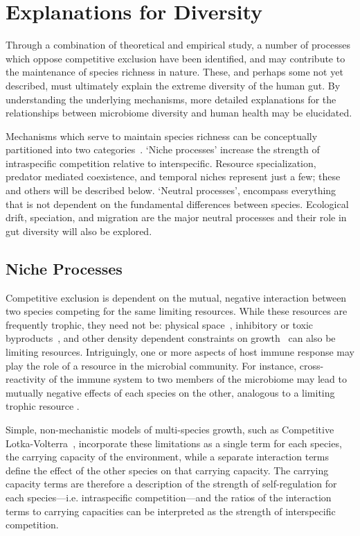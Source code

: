 \documentclass[12pt]{article}
\begin{document}
\section{Explanations for Diversity}
Through a combination of theoretical and empirical study, a number of
processes which oppose competitive exclusion have been identified,
and may contribute to the maintenance of species richness in nature.
These, and perhaps some not yet described,
must ultimately explain the extreme diversity of the human gut.
By understanding the underlying mechanisms,
more detailed explanations for the relationships between microbiome
diversity and human health may be elucidated.

Mechanisms which serve to maintain species richness can be conceptually
partitioned into two categories~\citep{Vellend2010}.
`Niche processes' increase the strength of intraspecific competition
relative to interspecific.
Resource specialization, predator mediated coexistence, and temporal niches
represent just a few;
these and others will be described below.
`Neutral processes', encompass everything that is not dependent on the
fundamental differences between species.
Ecological drift, speciation, and migration are the major neutral processes
and their role in gut diversity will also be explored.

\subsection{Niche Processes}
Competitive exclusion is dependent on the mutual, negative interaction
between two species competing for the same limiting resources.
While these resources are frequently trophic, they need not be:
physical space~\citep{Hastings1980,TODO},
inhibitory or toxic byproducts~\citep{TODO},
and other density dependent constraints on growth~\citep{TODO}
can also be limiting resources.
Intriguingly, one or more aspects of host immune response may
play the role of a resource in the microbial community.
For instance, cross-reactivity of the immune system to two members
of the microbiome may lead to mutually negative effects of each
species on the other, analogous to a limiting trophic resource
\citep[For a review of the interaction
       of the microbiota with the immune system:][]{Brestoff2013}.

Simple, non-mechanistic models of multi-species growth,
such as Competitive Lotka-Volterra~\citep{Lotka1925,Volterra1928},
incorporate these limitations as a single term for each species,
the carrying capacity of the environment,
while a separate interaction terms define the effect of the other species
on that carrying capacity.
The carrying capacity terms are therefore a description of the strength
of self-regulation for each species---i.e\@. intraspecific competition---and
the ratios of the interaction terms to carrying capacities can
be interpreted as the strength of interspecific competition.
\end{document}
